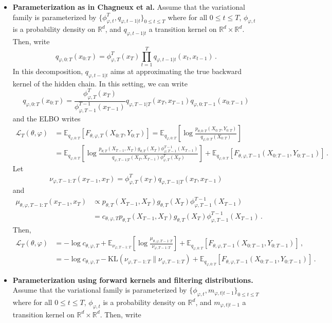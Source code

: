 \documentclass{article}
\newcommand{\1}{\mathbbm{1}}
\newcommand{\rset}{\ensuremath{\mathbb{R}}}
\begin{document}
\begin{itemize}
\item {\bf Parameterization as in Chagneux et al. } Assume that the variational family is parameterized by $\{\phi^T_{\varphi,t},q_{\varphi,t-1|t}\}_{0\leq t\leq T}$ where for all $0\leq t\leq T$, $\phi_{\varphi,t}$ is a probability density on $\rset^d$, and $q_{\varphi,t-1|t}$ a transition kernel on $\rset^d\times \rset^d$. Then, write
$$
q_{\varphi,0:T}(x_{0:T}) = \phi^T_{\varphi,T}(x_T)\prod_{t=1}^Tq_{\varphi,t-1|t}(x_t,x_{t-1})\,.
$$
In this decomposition, $q_{\varphi,t-1|t}$ aims at approximating the true backward kernel of the hidden chain. In this setting, we can write
$$
q_{\varphi,0:T}(x_{0:T}) = \frac{\phi^T_{\varphi,T}(x_T)}{\phi^{T-1}_{\varphi,T-1}(x_{T-1})}q_{\varphi,T-1|T}(x_T,x_{T-1})q_{\varphi,0:T-1}(x_{0:T-1})
$$
and the ELBO writes
\begin{align*}
\mathcal{L}_T(\theta,\varphi) &= \mathbb{E}_{q_{\varphi,0:T}}\left[F_{\theta,\varphi,T}(X_{0:T},Y_{0:T})\right] = \mathbb{E}_{q_{\varphi,0:T}}\left[\log \frac{p_{\theta,0:T}(X_{0:T},Y_{0:T})}{q_{\varphi,0:T}(X_{0:T})}\right]\\
&= \mathbb{E}_{q_{\varphi,0:T}}\left[\log  \frac{p_{\theta,T}(X_{T-1},X_T)g_{\theta,T}(X_T)\phi^{T-1}_{\varphi,T-1}(X_{T-1})}{q_{\varphi,T-1|T}(X_T,X_{T-1})\phi^T_{\varphi,T}(X_T)}\right] + \mathbb{E}_{q_{\varphi,0:T}}\left[F_{\theta,\varphi,T-1}(X_{0:T-1},Y_{0:T-1})\right]\,.
\end{align*}
Let 
$$
\nu_{\varphi,T-1:T}(x_{T-1},x_T) = \phi^T_{\varphi,T}(x_T)q_{\varphi,T-1|T}(x_T,x_{T-1})$$ and 
\begin{align*}
\mu_{\theta,\varphi,T-1:T}(x_{T-1},x_T) &\propto p_{\theta,T}(X_{T-1},X_T)g_{\theta,T}(X_T)\phi^{T-1}_{\varphi,T-1}(X_{T-1}) \\
&= c_{\theta,\varphi,T}p_{\theta,T}(X_{T-1},X_T)g_{\theta,T}(X_T)\phi^{T-1}_{\varphi,T-1}(X_{T-1})\,.
\end{align*}
Then,
\begin{align*}
\mathcal{L}_T(\theta,\varphi) &= - \log c_{\theta,\varphi,T}  + \mathbb{E}_{\nu_{\varphi,T-1:T}}\left[\log \frac{\mu_{\theta,\varphi,T-1:T}}{\nu_{\varphi,T-1:T}}\right]  + \mathbb{E}_{q_{\varphi,0:T}}\left[F_{\theta,\varphi,T-1}(X_{0:T-1},Y_{0:T-1})\right]\,,\\
&= - \log c_{\theta,\varphi,T}  -\mathrm{KL}(\nu_{\varphi,T-1:T}\|\nu_{\varphi,T-1:T})  + \mathbb{E}_{q_{\varphi,0:T}}\left[F_{\theta,\varphi,T-1}(X_{0:T-1},Y_{0:T-1})\right]\,.
\end{align*}
\item {\bf Parameterization using forward kernels and filtering distributions. } Assume that the variational family is parameterized by $\{\phi_{\varphi,t},m_{\varphi,t|t-1}\}_{0\leq t\leq T}$ where for all $0\leq t\leq T$, $\phi_{\varphi,t}$ is a probability density on $\rset^d$, and $m_{\varphi,t|t-1}$ a transition kernel on $\rset^d\times \rset^d$. Then, write

\end{itemize}
\end{document}
